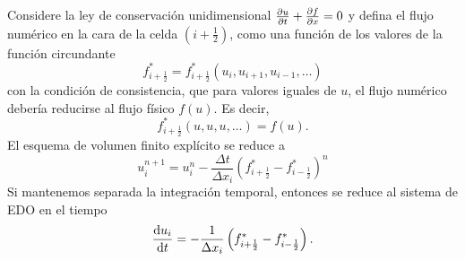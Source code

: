Considere la ley de conservación unidimensional
\begin{math}
	\diffp{u}{t}+\diffp{f}{x}=0
\end{math}
y defina el flujo numérico en la cara de la celda $(i+\frac{1}{2})$,
como una función de los valores de la función circundante
\begin{equation*}
	f_{i+\frac{1}{2}}^{\ast}=
	f_{i+\frac{1}{2}}^{\ast}
	\left(
	u_{i},u_{i+1},u_{i-1},\dotsc
	\right)
\end{equation*}
con la condición de consistencia, que para valores iguales de $u$, el
flujo numérico debería reducirse al flujo físico $f\left(u\right)$.
Es decir,
\begin{equation*}
	f_{i+\frac{1}{2}}^{\ast}
	\left(u,u,u,\dotsc\right)=
	f\left(u\right).
\end{equation*}
El esquema de volumen finito explícito se reduce a
\begin{equation*}
	u_{i}^{n+1}=
	u_{i}^{n}-
	\frac{\Delta t}{\Delta x_{i}}
	{\left(f_{i+\frac{1}{2}}^{\ast}-f_{i-\frac{1}{2}}^{\ast}\right)}^{n}
\end{equation*}
Si mantenemos separada la integración temporal, entonces se reduce al
sistema de EDO en el tiempo
\begin{equation*}
	\diff{u_{i}}{t}=
	-\frac{1}{\Delta x_{i}}
	\left(
		f_{i+\frac{1}{2}}^{\ast}-
	f_{i-\frac{1}{2}}^{\ast}
	\right).
\end{equation*}












